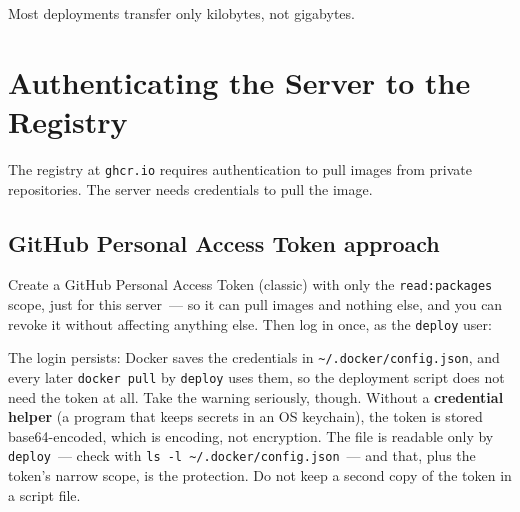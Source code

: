 \noindent{}Most deployments transfer only kilobytes, not gigabytes.

\setcounter{section}{2}
\section{Authenticating the Server to the Registry}\label{23-code-transfer:233-authenticating-the-server-to-the-registry}

The registry at \texttt{ghcr.io} requires authentication to pull images from private repositories. The server needs credentials to pull the image.

\subsection*{GitHub Personal Access Token approach}\label{23-code-transfer:github-personal-access-token-approach}

Create a GitHub Personal Access Token (classic) with only the \texttt{read:packages} scope, just for this server~--- so it can pull images and nothing else, and you can revoke it without affecting anything else. Then log in once, as the \texttt{deploy} user:

\begin{codebox}[short]

\begin{Shaded}
\begin{Highlighting}[]
   \KeywordTok{;} 
  \KeywordTok{|} 
 
\CommentTok{\# }
\end{Highlighting}
\end{Shaded}

\end{codebox}

\noindent{}The login persists: Docker saves the credentials in \texttt{\textasciitilde{}/}\allowbreak{}\texttt{.docker/}\allowbreak{}\texttt{config.json}, and every later \texttt{docker\ pull} by \texttt{deploy} uses them, so the deployment script does not need the token at all. Take the warning seriously, though. Without a \textbf{credential helper} (a program that keeps secrets in an OS keychain), the token is stored base64-encoded, which is encoding, not encryption. The file is readable only by \texttt{deploy}~--- check with \texttt{ls\ -}\allowbreak{}\texttt{l\ \textasciitilde{}/}\allowbreak{}\texttt{.}\allowbreak{}\texttt{docker/}\allowbreak{}\texttt{config.}\allowbreak{}\texttt{json}~--- and that, plus the token's narrow scope, is the protection. Do not keep a second copy of the token in a script file.

